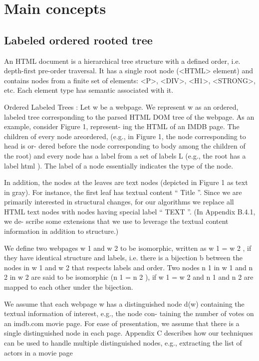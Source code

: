 \chapter{Main concepts}


\section{Labeled ordered rooted tree}

An HTML document is a hierarchical tree structure with a defined order, i.e. depth-first pre-order traversal. It has a single root node (<HTML> element) and contains nodes from a finite set of elements: <P>, <DIV>, <H1>, <STRONG>, etc. Each element type has semantic associated with it.

Ordered Labeled Trees : Let w be a webpage. We represent w as an ordered, labeled tree corresponding to the parsed HTML DOM tree of the webpage. As an example, consider Figure 1, represent- ing the HTML of an IMDB page. The children of every node areordered, (e.g., in Figure 1, the node corresponding to head is or- dered before the node corresponding to body among the children of the root) and every node has a label from a set of labels L (e.g., the root has a label html ). The label of a node essentially indicates the type of the node.

In addition, the nodes at the leaves are text nodes (depicted in Figure 1 as text in gray). For instance, the first leaf has textual content “ Title ”. Since we are primarily interested in structural changes, for our algorithms we replace all HTML text nodes with nodes having special label “ TEXT ”. (In Appendix B.4.1, we de- scribe some extensions that we use to leverage the textual content information in addition to structure.)

We define two webpages w 1 and w 2 to be isomorphic, written as w 1 = w 2 , if they have identical structure and labels, i.e. there is a bijection b between the nodes in w 1 and w 2 that respects labels and order. Two nodes n 1 in w 1 and n 2 in w 2 are said to be isomorphic (n 1 = n 2 ), if w 1 = w 2 and n 1 and n 2 are mapped to each other under the bijection.

We assume that each webpage w has a distinguished node d(w) containing the textual information of interest, e.g., the node con- taining the number of votes on an imdb.com movie page. For ease of presentation, we assume that there is a single distinguished node in each page. Appendix C describes how our techniques can be used to handle multiple distinguished nodes, e.g., extracting the list of actors in a movie page


